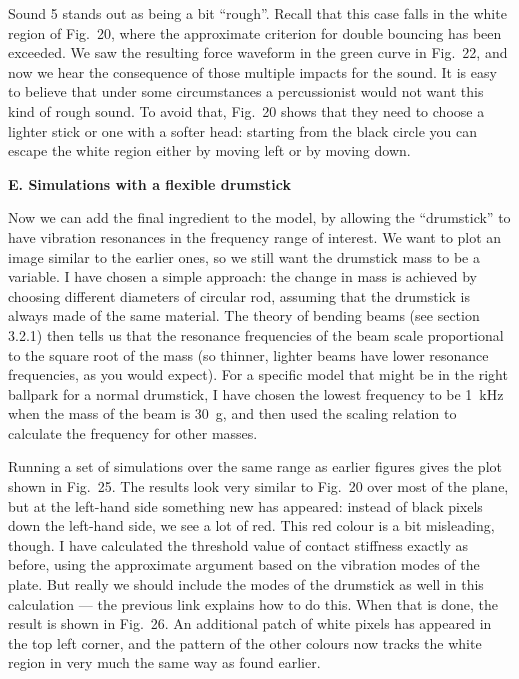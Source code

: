   Sound 5 stands out as being a bit “rough”. Recall that this case falls in the 
  white region of Fig.\ 20, where the approximate criterion for double bouncing 
  has been exceeded. We saw the resulting force waveform in the green curve in 
  Fig.\ 22, and now we hear the consequence of those multiple impacts for the 
  sound. It is easy to believe that under some circumstances a percussionist 
  would not want this kind of rough sound. To avoid that, Fig.\ 20 shows that 
  they need to choose a lighter stick or one with a softer head: starting from 
  the black circle you can escape the white region either by moving left or by 
  moving down. 

  \textbf{E. Simulations with a flexible drumstick} 

  Now we can add the final ingredient to the model, by allowing the “drumstick” 
  to have vibration resonances in the frequency range of interest. We want to 
  plot an image similar to the earlier ones, so we still want the drumstick 
  mass to be a variable. I have chosen a simple approach: the change in mass is 
  achieved by choosing different diameters of circular rod, assuming that the 
  drumstick is always made of the same material. The theory of bending beams 
  (see section 3.2.1) then tells us that the resonance frequencies of the beam 
  scale proportional to the square root of the mass (so thinner, lighter beams 
  have lower resonance frequencies, as you would expect). For a specific model 
  that might be in the right ballpark for a normal drumstick, I have chosen the 
  lowest frequency to be 1~kHz when the mass of the beam is 30~g, and then used 
  the scaling relation to calculate the frequency for other masses. 

  Running a set of simulations over the same range as earlier figures gives the 
  plot shown in Fig.\ 25. The results look very similar to Fig.\ 20 over most 
  of the plane, but at the left-hand side something new has appeared: instead 
  of black pixels down the left-hand side, we see a lot of red. This red colour 
  is a bit misleading, though. I have calculated the threshold value of contact 
  stiffness exactly as before, using the approximate argument based on the 
  vibration modes of the plate. But really we should include the modes of the 
  drumstick as well in this calculation — the previous link explains how to do 
  this. When that is done, the result is shown in Fig.\ 26. An additional patch 
  of white pixels has appeared in the top left corner, and the pattern of the 
  other colours now tracks the white region in very much the same way as found 
  earlier. 

